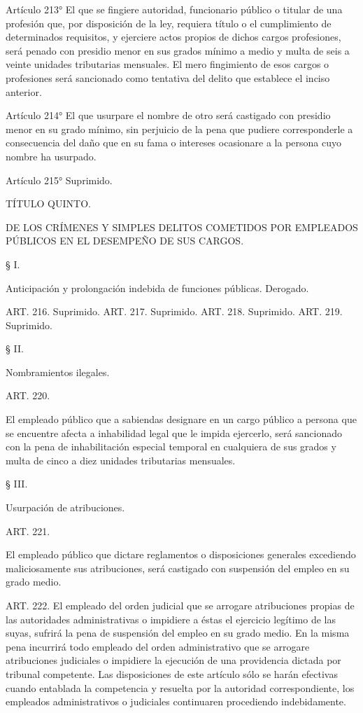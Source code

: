     Artículo 213° El que se fingiere autoridad, funcionario público o titular de una profesión que, por disposición de la ley, requiera título o el cumplimiento de determinados requisitos, y ejerciere actos propios de dichos cargos profesiones, será penado con presidio menor en sus grados mínimo a medio y multa de seis a veinte unidades tributarias mensuales.
    El mero fingimiento de esos cargos o profesiones será sancionado como tentativa del delito que establece el inciso anterior.




    Artículo 214° El que usurpare el nombre de otro será castigado con presidio menor en su grado mínimo, sin perjuicio de la pena que pudiere corresponderle a consecuencia del daño que en su fama o intereses ocasionare a la persona cuyo nombre ha usurpado.

    Artículo 215°  Suprimido.



    TÍTULO QUINTO.

DE LOS CRÍMENES Y SIMPLES DELITOS COMETIDOS POR EMPLEADOS PÚBLICOS EN EL DESEMPEÑO DE SUS CARGOS.


    § I.

    Anticipación y prolongación indebida de funciones públicas. Derogado.





    ART. 216. Suprimido.
    ART. 217. Suprimido.
    ART. 218. Suprimido.
    ART. 219. Suprimido.

    § II.

    Nombramientos ilegales.

    ART. 220.

    El empleado público que a sabiendas designare en un cargo público a persona que se encuentre afecta a inhabilidad legal que le impida ejercerlo, será sancionado con la pena de inhabilitación especial temporal en cualquiera de sus grados y multa de cinco a diez unidades tributarias mensuales.

    § III.

    Usurpación de atribuciones.


    ART. 221.

    El empleado público que dictare reglamentos o disposiciones generales excediendo maliciosamente sus atribuciones, será castigado con suspensión del empleo en su grado medio.


    ART. 222. El empleado del orden judicial que se arrogare atribuciones propias de las autoridades administrativas o impidiere a éstas el ejercicio legítimo de las suyas, sufrirá la pena de suspensión del empleo en su grado medio.
    En la misma pena incurrirá todo empleado del orden administrativo que se arrogare atribuciones judiciales o impidiere la ejecución de una providencia dictada por tribunal competente.
    Las disposiciones de este artículo sólo se harán efectivas cuando entablada la competencia y resuelta por la autoridad correspondiente, los empleados administrativos o judiciales continuaren procediendo indebidamente.



